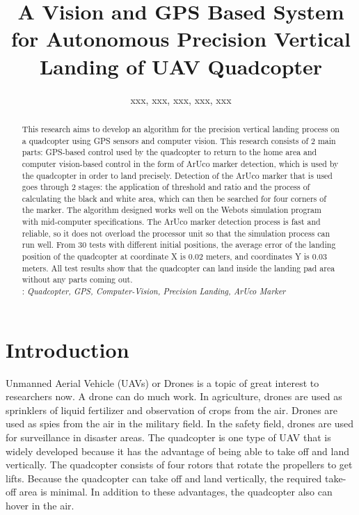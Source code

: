 \documentclass[a4paper]{jpconf}
\begin{document}
\title{A Vision and GPS Based System for Autonomous Precision Vertical Landing of UAV Quadcopter}




\author{xxx, xxx, xxx, xxx, xxx}

\address{Department of xxx, Indonesia}


\begin{abstract}
    This research aims to develop an algorithm for the precision vertical landing process on a quadcopter using GPS sensors and computer vision. This research consists of 2 main parts: GPS-based control used by the quadcopter to return to the home area and computer vision-based control in the form of ArUco marker detection, which is used by the quadcopter in order to land precisely. Detection of the ArUco marker that is used goes through 2 stages: the application of threshold and ratio and the process of calculating the black and white area, which can then be searched for four corners of the marker. The algorithm designed works well on the Webots simulation program with mid-computer specifications. The ArUco marker detection process is fast and reliable, so it does not overload the processor unit so that the simulation process can run well. From 30 tests with different initial positions, the average error of the landing position of the quadcopter at coordinate X is 0.02 meters, and coordinates Y is 0.03 meters. All test results show that the quadcopter can land inside the landing pad area without any parts coming out.\\

    : \it Quadcopter, GPS, Computer-Vision, Precision Landing, ArUco Marker

\end{abstract}

\section{Introduction}
Unmanned Aerial Vehicle (UAVs) or Drones is a topic of great interest to researchers now. A drone can do much work. In agriculture, drones are used as sprinklers of liquid fertilizer and observation of crops from the air\cite{ref1}. Drones are used as spies from the air in the military field\cite{ref2}. In the safety field, drones are used for surveillance in disaster areas\cite{ref3}. The quadcopter is one type of UAV that is widely developed because it has the advantage of being able to take off and land vertically. The quadcopter consists of four rotors that rotate the propellers to get lifts. Because the quadcopter can take off and land vertically, the required take-off area is minimal. In addition to these advantages, the quadcopter also can hover in the air.
\end{document}
